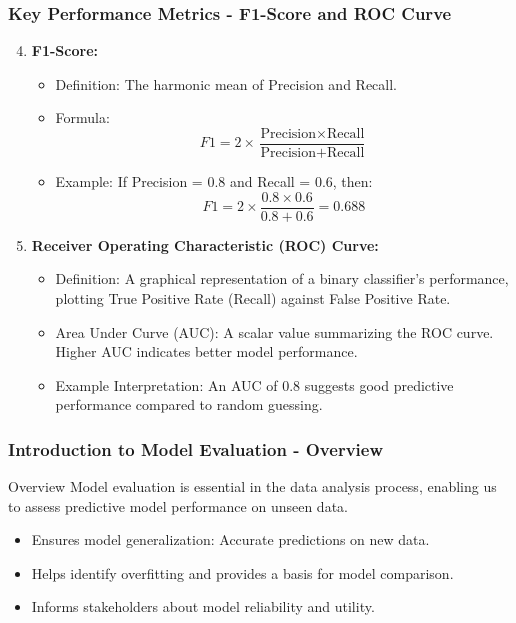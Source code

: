 \documentclass[aspectratio=169]{beamer}
\begin{document}
\begin{frame}[fragile]
    \frametitle{Key Performance Metrics - F1-Score and ROC Curve}
    \begin{enumerate}
        \setcounter{enumi}{3} %
        \item \textbf{F1-Score:}
        \begin{itemize}
            \item Definition: The harmonic mean of Precision and Recall.
            \item Formula:
            \[
            F1 = 2 \times \frac{\text{Precision} \times \text{Recall}}{\text{Precision} + \text{Recall}}
            \]
            \item Example: If Precision = 0.8 and Recall = 0.6, then:
            \[
            F1 = 2 \times \frac{0.8 \times 0.6}{0.8 + 0.6} = 0.688
            \]
        \end{itemize}

        \item \textbf{Receiver Operating Characteristic (ROC) Curve:}
        \begin{itemize}
            \item Definition: A graphical representation of a binary classifier's performance, plotting True Positive Rate (Recall) against False Positive Rate.
            \item Area Under Curve (AUC): A scalar value summarizing the ROC curve. Higher AUC indicates better model performance.
            \item Example Interpretation: An AUC of 0.8 suggests good predictive performance compared to random guessing.
        \end{itemize}
    \end{enumerate}
\end{frame}

\begin{frame}[fragile]
    \frametitle{Introduction to Model Evaluation - Overview}
    \begin{block}{Overview}
        Model evaluation is essential in the data analysis process, enabling us to assess predictive model performance on unseen data. 
    \end{block}
    \begin{itemize}
        \item Ensures model generalization: Accurate predictions on new data.
        \item Helps identify overfitting and provides a basis for model comparison.
        \item Informs stakeholders about model reliability and utility.
    \end{itemize}
\end{frame}
\end{document}
